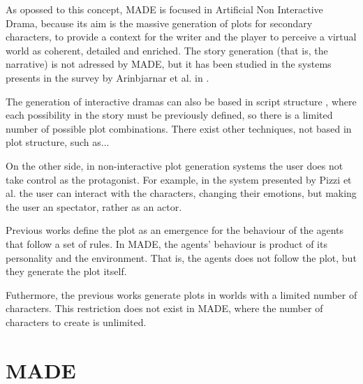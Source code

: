 \documentclass[runningheads]{llncs}
\begin{document}

As opossed to this concept, MADE is focused in Artificial Non Interactive Drama, because its aim is the massive generation of plots for secondary characters, to provide a context for the writer and the player to perceive a virtual world as coherent, detailed and enriched. The story generation (that is, the narrative) is not adressed by MADE, but it has been studied in the systems presents in the survey by Arinbjarnar et al. in \cite{ReviewArinbjarnar09}.


The generation of interactive dramas can also be based in script
structure \cite{ArchitectureYoung04}, where each possibility in the
story must be previously defined, so there is a limited number of
possible plot combinations. There exist other techniques, not based in
plot structure, such as... %

On the other side, in non-interactive plot generation systems the user does not take control as the protagonist. For example, in the system presented by Pizzi et al. \cite{pizzi2007interactive} the user can interact with the characters, changing their emotions, but making the user an spectator, rather as an actor. %

Previous works define the plot as an emergence for the behaviour of the agents that follow a set of rules. In MADE, the agents' behaviour is product of its personality and the environment. That is, the agents does not follow the plot, but they generate the plot itself. %

Futhermore, the previous works generate plots in worlds with a limited number of characters. This restriction does not exist in MADE, where the number of characters to create is unlimited.


\section{MADE}
\label{sec:made}
\end{document}

